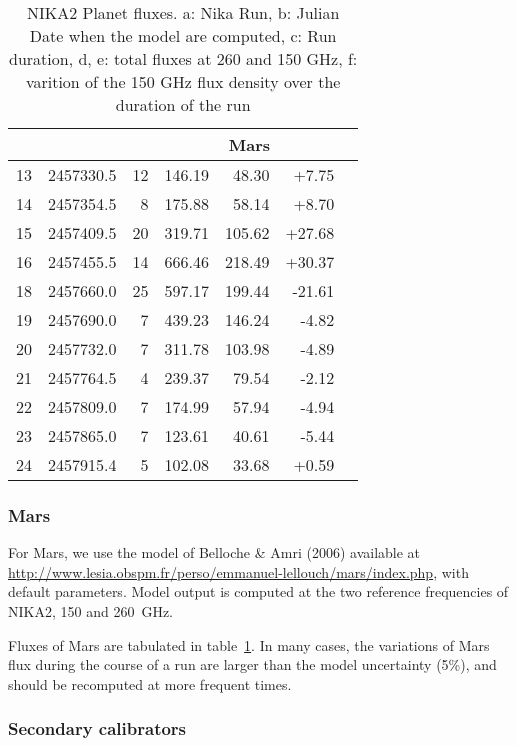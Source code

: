 \begin{table}
\begin{tabular}{|l|r|r|r|r|r|r|}
\hline
         &    &            & \multicolumn{3}{|c|}{Mars}\\
\hline
13 & 2457330.5 &  12 & 146.19 & 48.30 & +7.75\\
14 & 2457354.5 &  8 & 175.88 & 58.14 & +8.70\\
15 & 2457409.5 &  20 & 319.71 & 105.62 & +27.68\\
16 & 2457455.5 &  14 & 666.46 & 218.49 & +30.37\\
18 & 2457660.0 &  25 & 597.17 & 199.44 & -21.61\\
19 & 2457690.0 &  7 & 439.23 & 146.24 & -4.82\\
20 & 2457732.0 &  7 & 311.78 & 103.98 & -4.89\\
21 & 2457764.5 &  4 & 239.37 & 79.54 & -2.12\\
22 & 2457809.0 &  7 & 174.99 & 57.94 & -4.94\\
23 & 2457865.0 &  7 & 123.61 & 40.61 & -5.44\\
24 & 2457915.4 &  5 & 102.08 & 33.68 & +0.59 \\
\hline
\end{tabular}
\caption{NIKA2 Planet fluxes. a: Nika Run, b: Julian Date when the
  model are computed, c: Run duration, d, e: total fluxes at 260 and
  150 GHz, f: varition of the 150 GHz flux density over the duration
  of the run}
\label{tab:fluxPred}
\end{table}


\subsubsection{Mars}
For Mars, we use the model of Belloche \&  Amri (2006) available at
\url{http://www.lesia.obspm.fr/perso/emmanuel-lellouch/mars/index.php},
with default parameters. Model output is computed at the two reference
frequencies of NIKA2, 150 and 260~GHz.

Fluxes of Mars are tabulated in table~\ref{tab:fluxPred}. In many
cases, the variations of Mars flux during the course of a run are
larger than the model uncertainty (5\%), and should be recomputed at
more frequent times. 


\subsubsection{Secondary calibrators}

